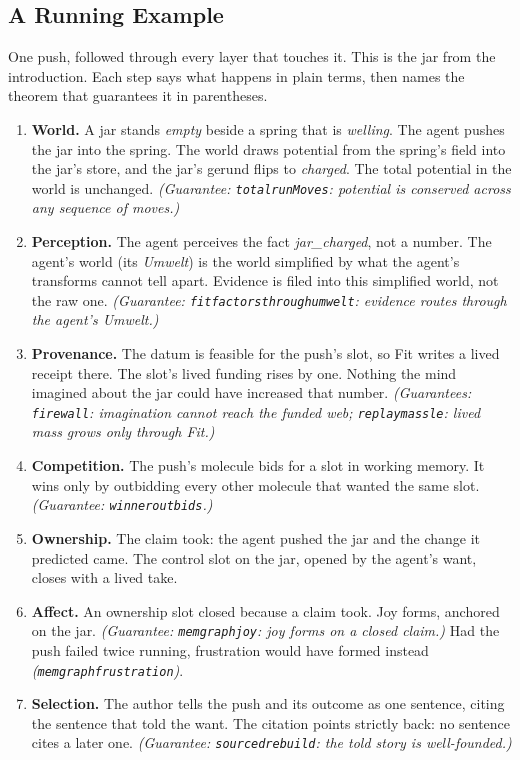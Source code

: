 \documentclass[11pt]{article}
\newcommand{\leanus}{\textunderscore\allowbreak}
\newcommand{\lean}[1]{{\let\_\leanus\texttt{#1}}}
\theoremstyle{remark}
\begin{document}
\subsection{A Running Example}
\label{sec:example}

One push, followed through every layer that touches it. This is the jar from the
introduction. Each step says what happens in plain terms, then names the theorem that
guarantees it in parentheses.

\begin{enumerate}[nosep]
    \item \textbf{World.} A jar stands \emph{empty} beside a spring that is \emph{welling}.
    The agent pushes the jar into the spring. The world draws potential from the spring's
    field into the jar's store, and the jar's gerund flips to \emph{charged}. The total
    potential in the world is unchanged.
    \emph{(Guarantee: \lean{total\_runMoves}: potential is conserved across any sequence of
    moves.)}

    \item \textbf{Perception.} The agent perceives the fact \emph{jar\_charged}, not a
    number. The agent's world (its \emph{Umwelt}) is the world simplified by what the
    agent's transforms cannot tell apart. Evidence is filed into this simplified world, not
    the raw one.
    \emph{(Guarantee: \lean{fit\_factors\_through\_umwelt}: evidence routes through the
    agent's Umwelt.)}

    \item \textbf{Provenance.} The datum is feasible for the push's slot, so Fit writes a
    lived receipt there. The slot's lived funding rises by one. Nothing the mind imagined
    about the jar could have increased that number.
    \emph{(Guarantees: \lean{firewall}: imagination cannot reach the funded web;
    \lean{replay\_mass\_le}: lived mass grows only through Fit.)}

    \item \textbf{Competition.} The push's molecule bids for a slot in working memory. It
    wins only by outbidding every other molecule that wanted the same slot.
    \emph{(Guarantee: \lean{winner\_outbids}.)}

    \item \textbf{Ownership.} The claim took: the agent pushed the jar and the change it
    predicted came. The control slot on the jar, opened by the agent's want, closes with a
    lived take.

    \item \textbf{Affect.} An ownership slot closed because a claim took. Joy forms,
    anchored on the jar.
    \emph{(Guarantee: \lean{mem\_graph\_joy}: joy forms on a closed claim.)} Had the push
    failed twice running, frustration would have formed instead
    \emph{(\lean{mem\_graph\_frustration})}.

    \item \textbf{Selection.} The author tells the push and its outcome as one sentence,
    citing the sentence that told the want. The citation points strictly back: no sentence
    cites a later one.
    \emph{(Guarantee: \lean{sourced\_rebuild}: the told story is well-founded.)}
\end{enumerate}
\end{document}
